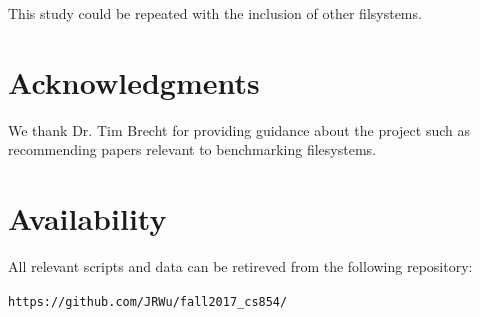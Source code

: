 \documentclass[letterpaper,twocolumn,10pt]{article}
\begin{document}
This study could be repeated with the inclusion of other filsystems. 

\section{Acknowledgments}
We thank Dr. Tim Brecht for providing guidance about the project such as recommending papers relevant to benchmarking filesystems. 

\section{Availability}\label{Availability}
All relevant scripts and data can be retireved from the following repository:
\begin{center}
{\tt https://github.com/JRWu/fall2017\_cs854/}
\end{center}


{\footnotesize 

\theendnotes


\newpage
}
\end{document}
